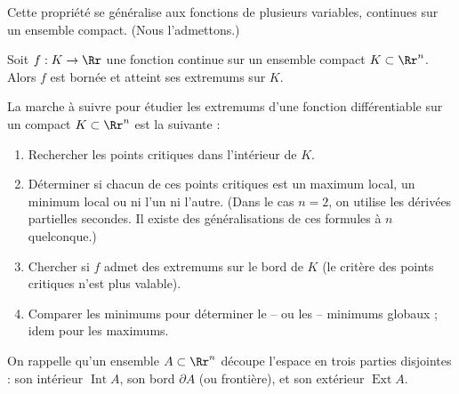 \documentclass[11pt, class=report,crop=false]{standalone}
\begin{document}
Cette propriété se généralise aux fonctions de plusieurs variables, continues sur un ensemble compact. (Nous l'admettons.)

\begin{proposition}
Soit $f : K \rightarrow \Rr$ une fonction continue sur un ensemble compact $K \subset \Rr^n$. Alors $f$ est bornée et atteint ses extremums sur $K$.
\end{proposition}

La marche à suivre pour étudier les extremums d'une fonction différentiable sur un compact $K \subset \Rr^n$ est la suivante :
\begin{enumerate}
    \item Rechercher les points critiques dans l'intérieur de $K$.
    \item Déterminer si chacun de ces points critiques est un maximum local, un minimum local ou ni l'un ni l'autre. (Dans le cas $n=2$, on utilise les dérivées partielles secondes. Il existe des généralisations de ces formules à $n$ quelconque.)
    \item Chercher si $f$ admet des extremums sur le bord de $K$ (le critère des points critiques n'est plus valable).
    \item Comparer les minimums pour déterminer le -- ou les -- minimums globaux  ; idem pour les maximums.
\end{enumerate}

On rappelle qu'un ensemble $A \subset \Rr^n$ découpe l'espace en trois parties disjointes : son intérieur $\operatorname{Int} A$, son bord $\partial A$ (ou frontière), et son extérieur $\operatorname{Ext} A$.


\end{document}
